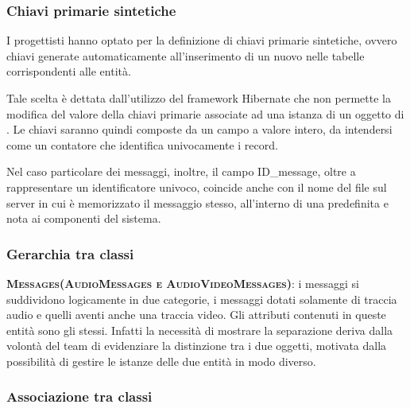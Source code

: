 \subsubsection{Chiavi primarie sintetiche}
I progettisti hanno optato per la definizione di chiavi primarie sintetiche, ovvero chiavi generate automaticamente all'inserimento di un nuovo  nelle tabelle corrispondenti alle entità.

Tale scelta è dettata dall'utilizzo del framework Hibernate che non permette la modifica del valore della chiavi primarie associate ad una istanza di un oggetto di . Le chiavi saranno quindi composte da un campo a valore intero, da intendersi come un contatore che identifica univocamente i record.

Nel caso particolare dei messaggi, inoltre, il campo ID\_message, oltre a rappresentare un identificatore univoco, coincide anche con il nome del file sul server in cui è memorizzato il messaggio stesso, all'interno di una  predefinita e nota ai componenti del sistema.

\subsubsection{Gerarchia tra classi}

\begin{description}
	\item{\scshape\bfseries Messages(AudioMessages e AudioVideoMessages)}: i messaggi si suddividono logicamente in due categorie, i messaggi dotati solamente di traccia audio e quelli aventi anche una traccia video. Gli attributi contenuti in queste entità sono gli stessi. Infatti la necessità di mostrare la separazione deriva dalla volontà del team di evidenziare la distinzione tra i due oggetti, motivata dalla possibilità di gestire le istanze delle due entità in modo diverso.
\end{description}

\subsubsection{Associazione tra classi}

